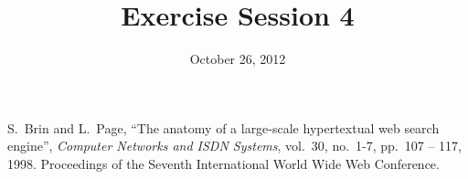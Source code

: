 \documentclass[10pt,a4paper]{article}
\title{Exercise Session 4}
\date{October 26, 2012}
\begin{document}
\lstset{language=[ISO]C++}
\maketitle






% 


%

\begin{thebibliography}{9}

 S.~Brin and L.~Page,
``The anatomy of a large-scale hypertextual web search engine'',
{\em Computer Networks and ISDN Systems}, vol.~30, no.~1-7, pp.~107 -- 117,
1998. Proceedings of the Seventh International World Wide Web Conference.

\end{thebibliography}
\end{document}

